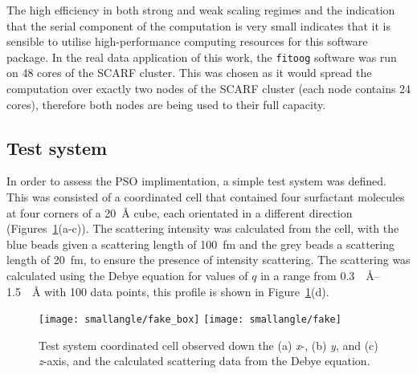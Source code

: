 The high efficiency in both strong and weak scaling regimes and the indication that the serial component of the computation is very small indicates that it is sensible to utilise high-performance computing resources for this software package.
In the real data application of this work, the \texttt{fitoog} software was run on 48 cores of the SCARF cluster.
This was chosen as it would spread the computation over exactly two nodes of the SCARF cluster (each node contains 24 cores), therefore both nodes are being used to their full capacity.

\subsection{Test system}
In order to assess the PSO implimentation, a simple test system was defined.
This was consisted of a coordinated cell that contained four surfactant molecules at four corners of a \SI{20}{\angstrom} cube, each orientated in a different direction (Figures~\ref{fig:test}(a-c)).
The scattering intensity was calculated from the cell, with the blue beads given a scattering length of \SI{100}{\femto\meter} and the grey beads a scattering length of \SI{20}{\femto\meter}, to ensure the presence of intensity scattering.
The scattering was calculated using the Debye equation \cite{debye_zerstreuung_1915} for values of $q$ in a range from \SIrange{0.3}{1.5}{\per\angstrom} with 100 data points, this profile is shown in Figure~\ref{fig:test}(d).
%
\begin{figure}
    \centering
    \texttt{[image: smallangle/fake\_box]}
    \texttt{[image: smallangle/fake]}
    \caption{Test system coordinated cell observed down the (a) \emph{x}-, (b) \emph{y}, and (c) \emph{z}-axis, and the calculated scattering data from the Debye equation.}
    \label{fig:test}
\end{figure}
%

